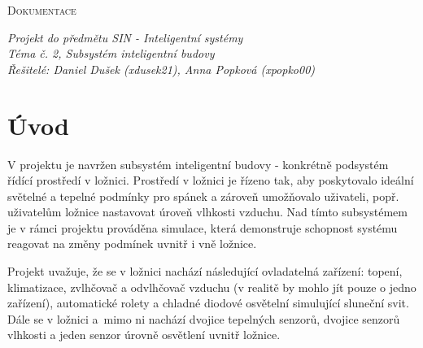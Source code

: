 \documentclass[a4paper,12pt]{article}
\renewcommand{\baselinestretch}{1.2}
\begin{document}
	

	\setlength{\parindent}{0pt}
	\vspace*{10pt}
	\LARGE \textsc{Dokumentace}
	\normalsize

	\vspace*{5pt}
	\textit{Projekt do předmětu SIN - Inteligentní systémy} \\
	\textit{Téma č. 2, Subsystém inteligentní budovy} \\
	\textit{Řešitelé: Daniel Dušek (xdusek21), Anna Popková (xpopko00)}

	\setlength{\parindent}{15pt}
	\setlength{\parskip}{15pt}
	\renewcommand{\baselinestretch}{1.5}
	\vspace*{15pt}
	
	\section{Úvod}

    V projektu je navržen subsystém inteligentní budovy - konkrétně podsystém řídící prostředí v ložnici. Prostředí v ložnici je řízeno tak, aby poskytovalo ideální světelné a tepelné podmínky pro spánek a zároveň umožňovalo uživateli, popř. uživatelům ložnice nastavovat úroveň vlhkosti vzduchu. Nad tímto subsystémem je v rámci projektu prováděna simulace, která demonstruje schopnost systému reagovat na změny podmínek uvnitř i vně ložnice. 

    Projekt uvažuje, že se v ložnici nachází následující ovladatelná zařízení: topení, klimatizace, zvlhčovač a odvlhčovač vzduchu (v realitě by mohlo jít pouze o jedno zařízení), automatické rolety a chladné diodové osvětelní simulující sluneční svit. Dále se v ložnici a~mimo ni nachází dvojice tepelných senzorů, dvojice senzorů vlhkosti a jeden senzor úrovně osvětlení uvnitř ložnice.
\end{document}
